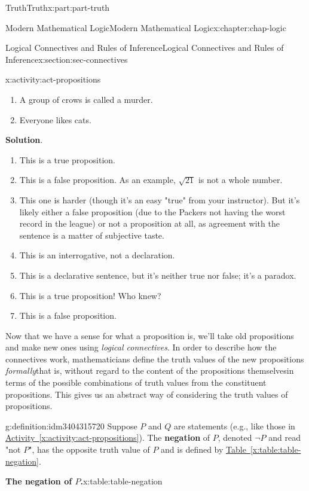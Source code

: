 \documentclass[oneside,10pt,]{book}
\newcommand{\blocktitlefont}{\relax}
\newcommand{\xreffont}{\relax}
\newcommand{\terminology}[1]{\textbf{#1}}
\numberwithin{equation}{section}
\begin{document}
\begin{partptx}{Truth}{}{Truth}{}{}{x:part:part-truth}
\begin{chapterptx}{Modern Mathematical Logic}{}{Modern Mathematical Logic}{}{}{x:chapter:chap-logic}
\begin{sectionptx}{Logical Connectives and Rules of Inference}{}{Logical Connectives and Rules of Inference}{}{}{x:section:sec-connectives}
\begin{activity}{}{x:activity:act-propositions}
\begin{enumerate}
\item{}A group of crows is called a murder.%
\item{}Everyone likes cats.%
\end{enumerate}
\par\smallskip%
\noindent\textbf{\blocktitlefont Solution}.\hypertarget{g:solution:idm3404321192}{}\quad{}%
\begin{enumerate}
\item{}This is a true proposition.%
\item{}This is a false proposition. As an example, \(\sqrt{21}\) is not a whole number.%
\item{}This one is harder (though it's an easy "true" from your instructor). But it's likely either a false proposition (due to the Packers not having the worst record in the league) or not a proposition at all, as agreement with the sentence is a matter of subjective taste.%
\item{}This is an interrogative, not a declaration.%
\item{}This is a declarative sentence, but it's neither true nor false; it's a paradox.%
\item{}This is a true proposition! Who knew?%
\item{}This is a false proposition.%
\end{enumerate}
\end{activity}%
Now that we have a sense for what a proposition is, we'll take old propositions and make new ones using \emph{logical connectives}. In order to describe how the connectives work, mathematicians define the truth values of the new propositions \emph{formally}\textemdash{}that is, without regard to the content of the propositions themselves\textemdash{}in terms of the possible combinations of truth values from the constituent propositions. This gives us an abstract way of considering the truth values of propositions.%
\begin{definition}{}{g:definition:idm3404315720}%
%
%
Suppose \(P\) and \(Q\) are statements (e.g., like those in \hyperref[x:activity:act-propositions]{Activity~{\xreffont\ref{x:activity:act-propositions}}}). The \terminology{negation} of \(P\), denoted \(\neg P\) and read "not \(P\)", has the opposite truth value of \(P\) and is defined by \hyperref[x:table:table-negation]{Table~{\xreffont\ref{x:table:table-negation}}}.%
\begin{tableptx}{\textbf{The negation of \(P\).}}{x:table:table-negation}{}%
\centering%

\end{tableptx}
\end{definition}
\end{sectionptx}
\end{chapterptx}
\end{partptx}
\end{document}
